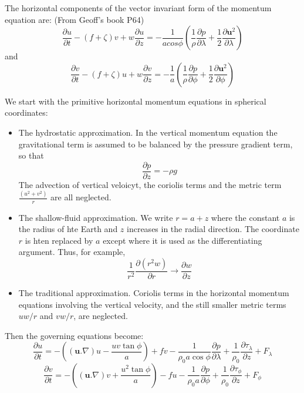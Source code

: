 \documentclass[..\EOYR.tex]{subfiles}
\begin{document}
The horizontal components of the vector invariant form of the momentum equation are: (From Geoff's book P64)
\begin{equation}\label{VIMomentumU}
    \frac{\partial u}{\partial t} - (f+\zeta)v + w\frac{\partial u}{\partial z} = -\frac{1}{a cos \phi}(\frac{1}{\rho}\frac{\partial p}{\partial \lambda} + \frac{1}{2}\frac{\partial \mathbf{u}^2}{\partial \lambda})
\end{equation}
and
\begin{equation}\label{VIMomentumV}
    \frac{\partial v}{\partial t} - (f+\zeta)u + w\frac{\partial v}{\partial z} = -\frac{1}{a}(\frac{1}{\rho}\frac{\partial p}{\partial \phi} + \frac{1}{2}\frac{\partial \mathbf{u}^2}{\partial \phi})
\end{equation}

We start with the primitive horizontal momentum equations in spherical coordinates:
\begin{itemize}
    \item The hydrostatic approximation. In the vertical momentum equation the gravitational term is assumed to be balanced by the pressure gradient term, so that
        \begin{equation}
            \frac{\partial p}{\partial z} = -\rho g
        \end{equation}
        The advection of vertical veloicyt, the coriolis terms and the metric term $\frac{(u^2 + v^2)}{r}$ are all neglected.
    \item The shallow-fluid approximation. We write $r=a+z$ where the constant $a$ is the radius of hte Earth and $z$ increases in the radial direction. The coordinate $r$ is hten replaced by $a$ except where it is used as the differentiating argument. Thus, for example,
        \begin{equation}
            \frac{1}{r^2}\frac{\partial (r^2 w)}{\partial r} \to \frac{\partial w}{\partial z}
        \end{equation}
    \item The traditional approximation. Coriolis terms in the horizontal momentum equations involving the vertical velocity, and the still smaller metric terms $uw/r$ and $vw/r$, are neglected.
\end{itemize}

Then the governing equations become:
\begin{equation} \label{PrimMomUMB}
    \frac{\partial u}{\partial t}=-((\mathbf{u}.\nabla)u - \frac{uv\tan \phi }{a}) + fv - \frac{1}{\rho_0 a \cos \phi}\frac{\partial p}{\partial \lambda} + \frac{1}{\rho_0}\frac{\partial \tau_\lambda}{\partial z} + F_\lambda
\end{equation}
\begin{equation} \label{PrimMomVMB}
    \frac{\partial v}{\partial t}=-((\mathbf{u}.\nabla)v + \frac{u^2\tan \phi }{a}) - fu - \frac{1}{\rho_0 a}\frac{\partial p}{\partial \phi} + \frac{1}{\rho_0}\frac{\partial \tau_\phi}{\partial z} + F_\phi
\end{equation}
\end{document}

